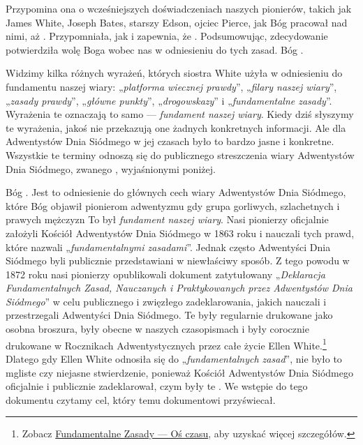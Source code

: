 Przypomina ona o wcześniejszych doświadczeniach naszych pionierów, takich jak James White, Joseph Bates, starszy Edson, ojciec Pierce, jak Bóg pracował nad nimi, aż  . Przypomniała, jak  i zapewnia, że . Podsumowując, zdecydowanie potwierdziła wolę Boga wobec nas w odniesieniu do tych zasad. Bóg .

Widzimy kilka różnych wyrażeń, których siostra White użyła w odniesieniu do fundamentu naszej wiary: „\textit{platforma wiecznej prawdy}”, „\textit{filary naszej wiary}”, „\textit{zasady prawdy}”, „\textit{główne punkty}”, „\textit{drogowskazy}” i „\textit{fundamentalne zasady}”. Wyrażenia te oznaczają to samo — \textit{fundament naszej wiary}. Kiedy dziś słyszymy te wyrażenia, jakoś nie przekazują one żadnych konkretnych informacji. Ale dla Adwentystów Dnia Siódmego w jej czasach było to bardzo jasne i konkretne. Wszystkie te terminy odnoszą się do publicznego streszczenia wiary Adwentystów Dnia Siódmego, zwanego , wyjaśnionymi poniżej.

Bóg . Jest to odniesienie do głównych cech wiary Adwentystów Dnia Siódmego, które Bóg objawił pionierom adwentyzmu  gdy grupa gorliwych, szlachetnych i prawych mężczyzn  To był \textit{fundament naszej wiary}. Nasi pionierzy oficjalnie założyli Kościół Adwentystów Dnia Siódmego w 1863 roku i nauczali tych prawd, które nazwali „\textit{fundamentalnymi zasadami}”. Jednak często Adwentyści Dnia Siódmego byli publicznie przedstawiani w niewłaściwy sposób. Z tego powodu w 1872 roku nasi pionierzy opublikowali dokument zatytułowany „\textit{Deklaracja Fundamentalnych Zasad, Nauczanych i Praktykowanych przez Adwentystów Dnia Siódmego}” w celu publicznego i zwięzłego zadeklarowania, jakich  nauczali i przestrzegali Adwentyści Dnia Siódmego. Te  były regularnie drukowane jako osobna broszura, były obecne w naszych czasopismach i były corocznie drukowane w Rocznikach Adwentystycznych przez całe życie Ellen White.\footnote{Zobacz \hyperref[appendix:timeline]{Fundamentalne Zasady — Oś czasu}, aby uzyskać więcej szczegółów.} Dlatego gdy Ellen White odnosiła się do „\textit{fundamentalnych zasad}”, nie było to mgliste czy niejasne stwierdzenie, ponieważ Kościół Adwentystów Dnia Siódmego oficjalnie i publicznie zadeklarował, czym były te . We wstępie do tego dokumentu czytamy cel, który temu dokumentowi przyświecał.

